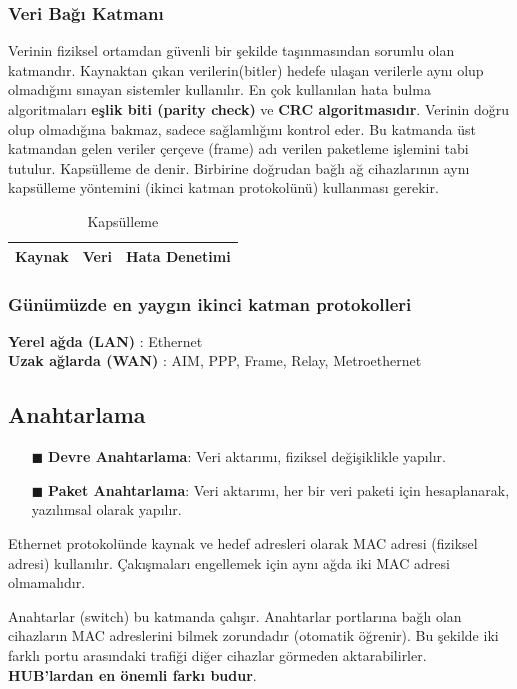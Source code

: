 \subsubsection{Veri Bağı Katmanı}\label{subsubsec:veri_bagi_katmani}
\tab Verinin fiziksel ortamdan güvenli bir şekilde taşınmasından sorumlu olan katmandır.
Kaynaktan çıkan verilerin(bitler) hedefe ulaşan verilerle aynı olup olmadığını sınayan sistemler kullanılır.
En çok kullanılan hata bulma algoritmaları \textbf{eşlik biti (parity check)} ve \textbf{CRC algoritmasıdır}.
Verinin doğru olup olmadığına bakmaz, sadece sağlamlığını kontrol eder.
Bu katmanda üst katmandan gelen veriler çerçeve (frame) adı verilen paketleme işlemini tabi tutulur.
Kapsülleme de denir.
Birbirine doğrudan bağlı ağ cihazlarının aynı kapsülleme yöntemini (ikinci katman protokolünü) kullanması gerekir.

\begin{table}[h]
	\centering
	\begin{tabular}{|c|c|c|}
		\hline
		Kaynak & Veri & Hata Denetimi \\
		\hline
	\end{tabular}
	\caption{Kapsülleme}
	\label{tab:table_kapsulleme}
\end{table}

\subsubsection*{Günümüzde en yaygın ikinci katman protokolleri}
\textbf{Yerel ağda (LAN)} : Ethernet \\
\textbf{Uzak ağlarda (WAN)} : AIM, PPP, Frame, Relay, Metroethernet
\subsection*{Anahtarlama}
\begin{enumerate}
	\item[$\blacksquare$] \textbf{Devre Anahtarlama}: Veri aktarımı, fiziksel değişiklikle yapılır.
	\item[$\blacksquare$] \textbf{Paket Anahtarlama}: Veri aktarımı, her bir veri paketi için hesaplanarak, yazılımsal olarak yapılır.
\end{enumerate}
Ethernet protokolünde kaynak ve hedef adresleri olarak MAC adresi (fiziksel adresi) kullanılır. Çakışmaları engellemek için aynı ağda iki MAC adresi olmamalıdır.

Anahtarlar (switch) bu katmanda çalışır.
Anahtarlar portlarına bağlı olan cihazların MAC adreslerini bilmek zorundadır (otomatik öğrenir).
Bu şekilde iki farklı portu arasındaki trafiği diğer cihazlar görmeden aktarabilirler. \textbf{HUB'lardan en önemli farkı budur}.

